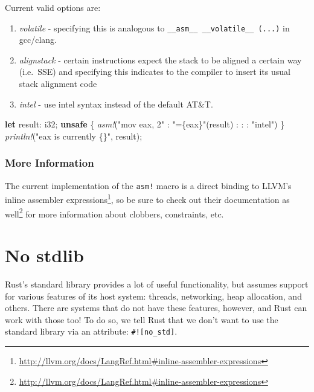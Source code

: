 \documentclass[a4paper,]{book}
\newenvironment{Shaded}{\begin{snugshade}}{\end{snugshade}}
\newcommand{\KeywordTok}[1]{\textcolor[rgb]{0.13,0.29,0.53}{\textbf{{#1}}}}
\newcommand{\DataTypeTok}[1]{\textcolor[rgb]{0.13,0.29,0.53}{{#1}}}
\newcommand{\StringTok}[1]{\textcolor[rgb]{0.31,0.60,0.02}{{#1}}}
\newcommand{\PreprocessorTok}[1]{\textcolor[rgb]{0.56,0.35,0.01}{\textit{{#1}}}}
\newcommand{\NormalTok}[1]{{#1}}
\renewcommand{\href}[2]{#2\footnote{\url{#1}}}
\providecommand{\tightlist}{%
  \setlength{\itemsep}{0pt}\setlength{\parskip}{0pt}}
\begin{document}
Current valid options are:

\begin{enumerate}
\def\labelenumi{\arabic{enumi}.}
\tightlist
\item
  \emph{volatile} - specifying this is analogous to
  \texttt{\_\_asm\_\_\ \_\_volatile\_\_\ (...)} in gcc/clang.
\item
  \emph{alignstack} - certain instructions expect the stack to be
  aligned a certain way (i.e.~SSE) and specifying this indicates to the
  compiler to insert its usual stack alignment code
\item
  \emph{intel} - use intel syntax instead of the default AT\&T.
\end{enumerate}

\begin{Shaded}
\begin{Highlighting}[]
\KeywordTok{let} \NormalTok{result: }\DataTypeTok{i32}\NormalTok{;}
\KeywordTok{unsafe} \NormalTok{\{}
   \PreprocessorTok{asm!}\NormalTok{(}\StringTok{"mov eax, 2"} \NormalTok{: }\StringTok{"=\{eax\}"}\NormalTok{(result) : : : }\StringTok{"intel"}\NormalTok{)}
\NormalTok{\}}
\PreprocessorTok{println!}\NormalTok{(}\StringTok{"eax is currently \{\}"}\NormalTok{, result);}
\end{Highlighting}
\end{Shaded}

\subsubsection{More Information}\label{more-information}

The current implementation of the \texttt{asm!} macro is a direct
binding to
\href{http://llvm.org/docs/LangRef.html\#inline-assembler-expressions}{LLVM's
inline assembler expressions}, so be sure to check out
\href{http://llvm.org/docs/LangRef.html\#inline-assembler-expressions}{their
documentation as well} for more information about clobbers, constraints,
etc.

\hypertarget{sec--no-stdlib}{\section{No stdlib}\label{sec--no-stdlib}}

Rust's standard library provides a lot of useful functionality, but
assumes support for various features of its host system: threads,
networking, heap allocation, and others. There are systems that do not
have these features, however, and Rust can work with those too! To do
so, we tell Rust that we don't want to use the standard library via an
attribute: \texttt{\#!{[}no\_std{]}}.
\end{document}
